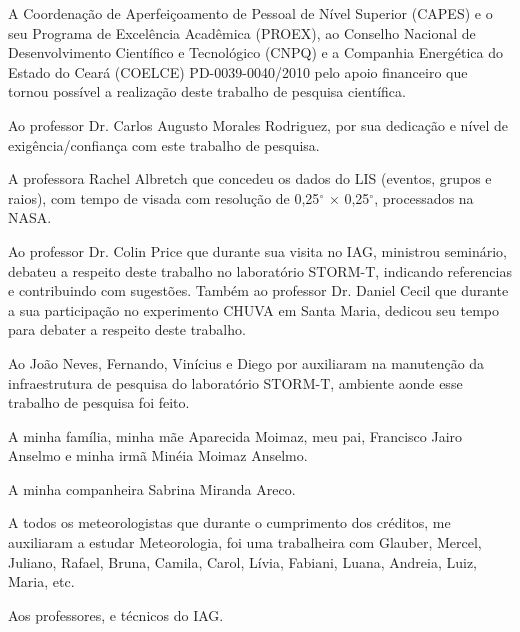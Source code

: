 \documentclass[12pt,a4paper,tocpage=plain,floatnumber=continuous,chapter=TITLE,appendix=nobox,font=plain, header=ruled,hyperindex=false]{abnt}
\begin{document}

A Coordenação de Aperfeiçoamento de Pessoal de Nível Superior (CAPES) e o seu Programa de Excelência Acadêmica (PROEX), ao Conselho Nacional de Desenvolvimento Científico e Tecnológico (CNPQ) e a Companhia Energética do Estado do Ceará (COELCE) PD-0039-0040/2010 pelo apoio financeiro que tornou possível a realização deste trabalho de pesquisa científica.

Ao professor Dr. Carlos Augusto Morales Rodriguez, por sua dedicação e nível de exigência/confiança com este trabalho de pesquisa. 

A professora Rachel Albretch que concedeu os dados do LIS (eventos, grupos e raios), com tempo de visada com resolução de 0,25$^{\circ}$ $\times$ 0,25$^{\circ}$, processados na NASA.

Ao professor Dr. Colin Price que durante sua visita no IAG, ministrou seminário, debateu a respeito deste trabalho no laboratório STORM-T, indicando referencias e contribuindo com sugestões. Também ao professor Dr. Daniel Cecil que durante a sua participação no experimento CHUVA em Santa Maria, dedicou seu tempo para debater a respeito deste trabalho.   

Ao João Neves, Fernando, Vinícius e Diego por auxiliaram na manutenção da infraestrutura de pesquisa do laboratório STORM-T, ambiente aonde esse trabalho de pesquisa foi feito.

A minha família, minha mãe Aparecida Moimaz, meu pai, Francisco Jairo Anselmo e minha irmã Minéia Moimaz Anselmo. 

A minha companheira Sabrina Miranda Areco.

A todos os meteorologistas que durante o cumprimento dos créditos, me auxiliaram a estudar Meteorologia, foi uma trabalheira com  Glauber, Mercel, Juliano, Rafael, Bruna, Camila, Carol, Lívia, Fabiani, Luana, Andreia, Luiz, Maria, etc.

Aos professores, e técnicos do IAG.
\end{document}
